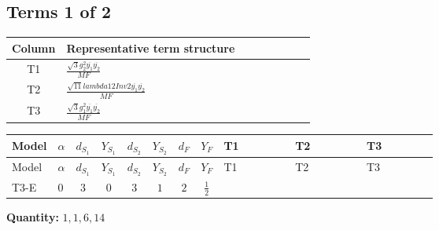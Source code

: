 \documentclass[8pt]{article}
\begin{document}
\begin{landscape}
\subsection*{Terms 1 of 2}
\begin{center}
\begin{tabular}{@{}c >{\raggedright\arraybackslash}p{0.82\linewidth}@{}}
\toprule
Column & Representative term structure \\
\midrule
T1 & \(\displaystyle \frac{\sqrt{3} g_{2}^{2} \overline{y_{1}} \overline{y_{2}}}{MF}\) \\
\midrule
T2 & \(\displaystyle \frac{\sqrt{11} lambda12Inv2 \overline{y_{1}} \overline{y_{2}}}{MF}\) \\
\midrule
T3 & \(\displaystyle \frac{\sqrt{3} g_{1}^{2} \overline{y_{1}} \overline{y_{2}}}{MF}\) \\
\midrule
\bottomrule
\end{tabular}
\end{center}
\smallskip
\tiny
\begin{longtable}{@{}llcccccc >{\raggedright\arraybackslash}p{0.21\linewidth} >{\raggedright\arraybackslash}p{0.21\linewidth} >{\raggedright\arraybackslash}p{0.21\linewidth}@{}}
\toprule
Model & $\alpha$ & $d_{S_1}$ & $Y_{S_1}$ & $d_{S_2}$ & $Y_{S_2}$ & $d_F$ & $Y_F$ & T1 & T2 & T3 \\
\midrule
\endfirsthead
\toprule
Model & $\alpha$ & $d_{S_1}$ & $Y_{S_1}$ & $d_{S_2}$ & $Y_{S_2}$ & $d_F$ & $Y_F$ & T1 & T2 & T3 \\
\midrule
\endhead
T3-E & $0$ & $3$ & $0$ & $3$ & $1$ & $2$ & $\frac{1}{2}$ & \scriptsize\adjustbox{max width=\linewidth}{$\begin{gathered} - \frac{11 \sqrt{3} g_{2}^{2} \overline{y_{1}} \overline{y_{2}}}{8 MF}\end{gathered}$} & \scriptsize\adjustbox{max width=\linewidth}{$\begin{gathered} - \frac{3 \sqrt{11} lambda12Inv2 \overline{y_{1}} \overline{y_{2}}}{22 MF}\end{gathered}$} & \scriptsize\adjustbox{max width=\linewidth}{$\begin{gathered} - \frac{\sqrt{3} g_{1}^{2} \overline{y_{1}} \overline{y_{2}}}{8 MF}\end{gathered}$} \\
\midrule
\bottomrule
\end{longtable}
\clearpage
\noindent\textbf{Quantity: }$\mathrm{1,1,6,14}$\par\smallskip

\end{landscape}
\end{document}
